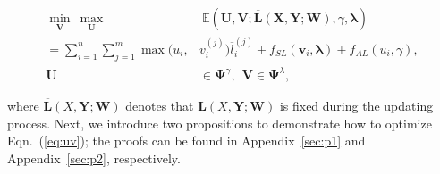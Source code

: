 \documentclass[journal]{IEEEtran}
\begin{document}
\begin{small}	\begin{equation}
	\begin{aligned}
	\underset{ \mathbf{V}}{\min} \
	\underset{\mathbf{U}}{\max}& \  
	\mathbb{E}(\mathbf{U},\mathbf{V}; \mathbf{\overline{L}(X, \mathbf{Y}; \mathbf{W})}, \gamma,{\bm \lambda}) \\= \sum_{i=1}^{n}\sum_{j=1}^{m}\max(u_i,&v^{(j)}_i)\overline{l}^{(j)}_i + f_{SL}(\mathbf{v}_i,{\bm \lambda}) + f_{AL}(u_i,\gamma), \\
	\mathbf{U}&\in\mathbf{\Psi}^\gamma, \ \ \mathbf{V}\in\mathbf{\Psi}^\lambda,
	\label{eq:uv}
	\end{aligned}
	\end{equation}
\end{small}where $\mathbf{\overline{L}}(X, \mathbf{Y}; \mathbf{W})$ denotes that $\mathbf{L}(X, \mathbf{Y}; \mathbf{W})$ is fixed during the {updating} process. Next, we introduce two propositions to demonstrate how to optimize Eqn.~(\ref{eq:uv}); the proofs can be found in Appendix~\ref{sec:p1} and Appendix~\ref{sec:p2}, respectively.
\end{document}

